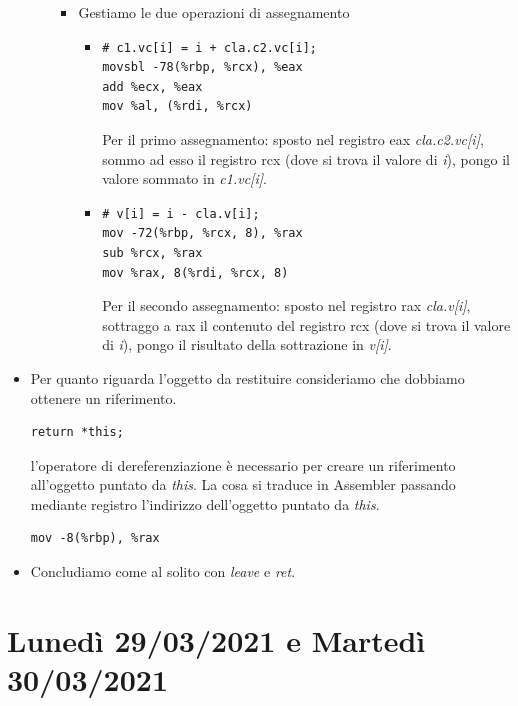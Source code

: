 \documentclass[11pt]{report}
\theoremstyle{definition}
\begin{document}
\begin{itemize}
\begin{itemize}
\begin{itemize}
\item Gestiamo le due operazioni di assegnamento
\begin{itemize}
\item 
\begin{verbatim} 
# c1.vc[i] = i + cla.c2.vc[i];
movsbl -78(%rbp, %rcx), %eax
add %ecx, %eax
mov %al, (%rdi, %rcx)
\end{verbatim}
Per il primo assegnamento: sposto nel registro eax \emph{cla.c2.vc[i]}, sommo ad esso il registro rcx (dove si trova il valore di \emph{i}), pongo il valore sommato in \emph{c1.vc[i]}.
\item 
\begin{verbatim}
# v[i] = i - cla.v[i];    
mov -72(%rbp, %rcx, 8), %rax
sub %rcx, %rax
mov %rax, 8(%rdi, %rcx, 8)
\end{verbatim}
Per il secondo assegnamento: sposto nel registro rax \emph{cla.v[i]}, sottraggo a rax il contenuto del registro rcx (dove si trova il valore di \emph{i}), pongo il risultato della sottrazione in \emph{v[i]}.
\end{itemize}
\end{itemize}
\end{itemize}
\item Per quanto riguarda l'oggetto da restituire consideriamo che dobbiamo ottenere un riferimento. 
\begin{verbatim}
return *this;
\end{verbatim}
l'operatore di dereferenziazione è necessario per creare un riferimento all'oggetto puntato da \emph{this}. La cosa si traduce in Assembler passando mediante registro l'indirizzo dell'oggetto puntato da \emph{this}.
\begin{verbatim}
mov -8(%rbp), %rax
\end{verbatim}
\item Concludiamo come al solito con \emph{leave} e \emph{ret}.
\end{itemize}
\endgroup

\chapter{Lunedì 29/03/2021 e Martedì 30/03/2021}
\end{document}
